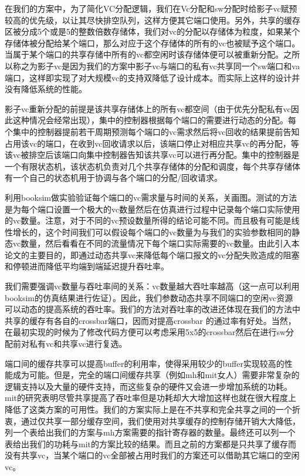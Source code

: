 ﻿\documentclass[10pt,journal]{IEEEtran}
\begin{document}
在我们的方案中，为了简化VC分配逻辑，我们在Vc分配和sw分配时给影子vc赋预较高的优先级，以让其尽快排空队列，这样方便其它端口使用。另外，共享的缓存区被分成5个或是5的整数倍数存储体，我们对vc的分配以存储体为粒度，如果某个存储体被分配给某个端口，那么对应于这个存储体的所有的vc也被赋予这个端口。当属于某个端口的共享存储中所有的vc都空闲时该存储体便可以被重新分配。之所以称之为影子vc是因为我们的方案中影子vc与端口的私有vc共享同一个sw端口和va端口，这样即实现了对大规模vc的支持双降低了设计成本。而实际上这样的设计并没有降低系统的性能。

影子vc重新分配的前提是该共享存储体上的所有vc都空间（由于优先分配私有vc因此这种情况会经常出现），集中的控制器根据每个端口的需要进行动态的分配。每个集中的控制器提前若干周期预测每个端口的vc需求然后将vc回收的结果提前告知占用该vc的端口，在收到vc回收请求以后，该端口停止对相应共享vc的再分配，等该vc被排空后该端口向集中控制器告知该共享vc可以进行再分配。集中的控制器是一个有限状态机，该状态机负责对几个共享存储体的分配和调度，每个共享存储体有一个自己的状态机用于协调与各个端口的分配/回收请求。

利用booksim做实验验证每个端口的vc需求量与时间的关系，关画图。测试的方法是为每个端口设置一个极大的vc数量然后在仿真进行过程中记录每个端口实际使用的vc数量。注意，对于不同的vc预设数量所得的结论可能不同。而且极有可能是线性增长的，这个时间我们可以假设每个端口的vc数量为与我们的实验参数相同的静态vc数量，然后看看在不同的流量情况下每个端口实际需要的vc数量。由此引入本论文的主要目的，即通过动态共享vc来降低每个端口报文的vc分配失败造成的阻塞和停顿进而降低平均端到端延迟提升吞吐率。

我们需要强调vc数量与吞吐率间的关系：vc数量越大吞吐率越高（这一点可以利用booksim的仿真结果进行佐证）。因此，我们参数动态共享不同端口的空闲vc资源可以动态的提高系统的吞吐率。我们的方法对吞吐率的改进还体现在我们的方法中共享的缓存有各自的crossbar端口，因而对提高crossbar 的通过率有好处。当然，在最初实现的时候为了修改代码方便可以考虑采用5x5的crossbar然后在进行sw分配前对私有vc和共享vc进行复选。

端口间的缓存共享可以提高buffer的利用率，使得采用较少的buffer实现较高的性能成为可能。但是，完全的端口间缓存共享（例如mh和mit女人）需要非常复杂的逻辑支持以及大量的硬件支持，而这些复杂的硬件又会进一步增加系统的功耗。mit的研究表明尽管共享提高了吞吐率但是功耗却大大增加这样也就在很大程度上降低了这类方案的可用性。我们的方案实际上是在不共享和完全共享之间的一个折衷，通过仅共享一部分缓存空间，我们使用对共享缓存的控制存储开销大大降低，列一个表给出我们的方案与mh方案需要的指针寄存器的数量。最终还可以列一个表给出我们的功耗与mit的方案比较的结果。而且之前的方案都是只共享了缓存而没有共享vc，当某个端口的vc全部被占用时我们的方案还可以借助其它端口的空闲vc。
\end{document}
